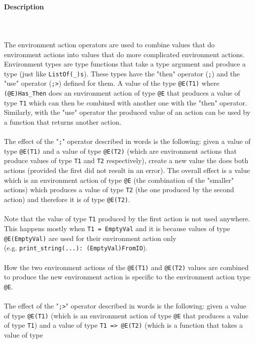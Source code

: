 \documentclass[diploma]{softlab-thesis}
\def\pend{\mbox{}\\\\}
\begin{document}
\newpage
\paragraph{Description}\pend
The environment action operators are used to combine values that do environment
actions into values that do more complicated environment actions. Environment
types are type functions that take a type argument and produce a type
(just like \verb|ListOf(_)s|). These types have the "then" operator
(\verb|;|) and the "use" operator (\verb|;>|) defined for them.  A value of the
type \verb|@E(T1)| where \verb|(@E)Has_Then| does an environment action of type
\verb|@E| that produces a value of type \verb|T1| which can then be combined
with another one with the "then" operator. Similarly, with the "use" operator
the produced value of an action can be used by a function that returns another
action.
\\\\
The effect of the "\verb|;|" operator described in words is the following:
given a value of type \verb|@E(T1)| and a value of type \verb|@E(T2)|
(which are environment actions that produce values of type \verb|T1| and
\verb|T2| respectively), create a new value the does both actions (provided
the first did not result in an error).  The overall effect is a value which is
an environment action of type \verb|@E| (the combination of the "smaller"
actions) which produces a value of type \verb|T2| (the one produced by the
second action) and therefore it is of type \verb|@E(T2)|.
\\\\
Note that the value of type \verb|T1| produced by the first action is not
used anywhere. This happens mostly when \verb|T1 = EmptyVal| and it is
because values of type \verb|@E(EmptyVal)| are used for their environment
action only \\(e.g. \verb|print_string(...): (EmptyVal)FromIO|).
\\\\
How the two environment actions of the \verb|@E(T1)| and \verb|@E(T2)|
values are combined to produce the new environment action is specific to the
environment action type \verb|@E|.
\\\\
The effect of the "\verb|;>|" operator described in words is the following:
given a value of type \verb|@E(T1)| (which is an environment action of type
\verb|@E| that produces a value of type \verb|T1|) and a value of type
\verb|T1 => @E(T2)| (which is a function that takes a value of type
\end{document}
